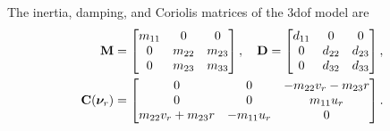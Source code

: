 The inertia, damping, and Coriolis matrices of the 3\gls{dof} model are \cite{fredriksen_global_2006}
\begin{align}
    \mathbf{M} &= 
    \begin{bmatrix}
        m_{11} & 0 & 0 \\ 0 & m_{22} & m_{23} \\ 0 & m_{23} & m_{33}
    \end{bmatrix}, \quad
    \mathbf{D} =
    \begin{bmatrix}
        d_{11} & 0 & 0 \\ 0 & d_{22} & d_{23} \\ 0 & d_{32} & d_{33}
    \end{bmatrix}, \\
    \mathbf{C}(\bm{\nu}_r) &=
    \begin{bmatrix}
        0 & 0 & -m_{22}v_r - m_{23}r \\ 0 & 0 & m_{11}u_r \\ m_{22}v_r + m_{23}r & -m_{11}u_r & 0
    \end{bmatrix}.
\end{align}

